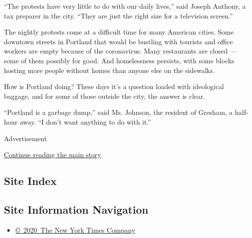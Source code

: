 ``The protests have very little to do with our daily lives,'' said
Joseph Anthony, a tax preparer in the city. ``They are just the right
size for a television screen.''

The nightly protests come at a difficult time for many American cities.
Some downtown streets in Portland that would be bustling with tourists
and office workers are empty because of the coronavirus. Many
restaurants are closed --- some of them possibly for good. And
homelessness persists, with some blocks hosting more people without
homes than anyone else on the sidewalks.

How is Portland doing? These days it's a question loaded with
ideological baggage, and for some of those outside the city, the answer
is clear.

``Portland is a garbage dump,'' said Ms. Johnson, the resident of
Gresham, a half-hour away. ``I don't want anything to do with it.''

Advertisement

\protect\hyperlink{after-bottom}{Continue reading the main story}

\hypertarget{site-index}{%
\subsection{Site Index}\label{site-index}}

\hypertarget{site-information-navigation}{%
\subsection{Site Information
Navigation}\label{site-information-navigation}}

\begin{itemize}
\tightlist
\item
  \href{https://help.nytimes3xbfgragh.onion/hc/en-us/articles/115014792127-Copyright-notice}{©~2020~The
  New York Times Company}
\end{itemize}

